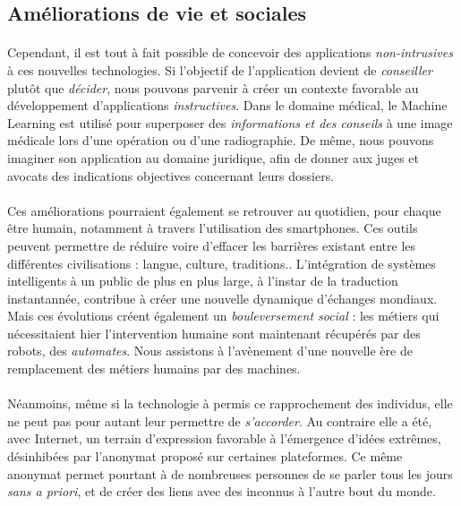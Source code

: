\subsection*{Améliorations de vie et sociales}

\paragraph{} Cependant, il est tout à fait possible de concevoir des applications \emph{non-intrusives} à ces
nouvelles technologies. Si l'objectif de l'application devient de \emph{conseiller} plutôt que \emph{décider},
nous pouvons parvenir à créer un contexte favorable au développement d'applications \emph{instructives}. Dans le
domaine médical, le Machine Learning est utilisé pour superposer des \emph{informations et des conseils} à
une image médicale lors d'une opération ou d'une radiographie. De même, nous pouvons imaginer son 
application au domaine juridique, afin de donner aux juges et avocats des indications objectives concernant leurs
dossiers.

\paragraph{} Ces améliorations pourraient également se retrouver au quotidien, pour chaque être humain, notamment
à travers l'utilisation des smartphones. Ces outils peuvent permettre de réduire voire d'effacer les barrières 
existant entre les différentes civilisations : langue, culture, traditions.. L'intégration de systèmes intelligents 
à un public de plus en plus large, à l'instar de la traduction instantannée, contribue à créer une nouvelle
dynamique d'échanges mondiaux. Mais ces évolutions créent également un \emph{bouleversement social} : les métiers
qui nécessitaient hier l'intervention humaine sont maintenant récupérés par des robots, des \emph{automates}.
Nous assistons à l'avènement d'une nouvelle ère de remplacement des métiers humains par des machines.

\paragraph{} Néanmoins, même si la technologie à permis ce rapprochement des individus, elle ne peut pas pour
autant leur permettre de \emph{s'accorder}. Au contraire elle a été, avec Internet, un terrain d'expression
favorable à l'émergence d'idées extrêmes, désinhibées par l'anonymat proposé sur certaines plateformes. Ce même
anonymat permet pourtant à de nombreuses personnes de se parler tous les jours \emph{sans a priori}, et de créer
des liens avec des inconnus à l'autre bout du monde.

